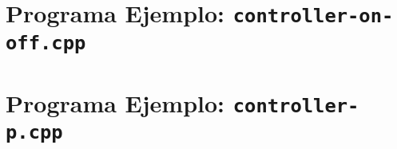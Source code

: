 %
%


\cleardoublepage
\section{Programa Ejemplo: \texttt{controller-on-off.cpp}}%
\label{sec:appendix1}


\cleardoublepage
\section{Programa Ejemplo: \texttt{controller-p.cpp}}%
\label{sec:appendix2}


